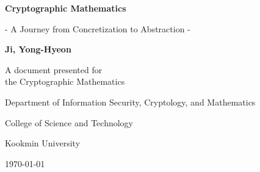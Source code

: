 \begin{titlepage}
    \centering
    
    \vspace*{1cm}
    
    \Huge\textsf{\textbf{Cryptographic Mathematics}}
    
    \vspace{0.5cm}
    \LARGE\textsf{- A Journey from Concretization to Abstraction -}
    
    \vspace{1.5cm}
    \textbf{Ji, Yong-Hyeon}

    \vfill
    A document presented for\\
    the Cryptographic Mathematics
    
    \vspace{0.8cm}
    {\large\textsf{Department of Information Security, Cryptology, and Mathematics}\par}
    {\large\textsf{College of Science and Technology}\par}
    {\large\textsf{Kookmin University}\par}
    \vspace{.25in}
    {\large \textsf{\today}\par}
    
\end{titlepage}

